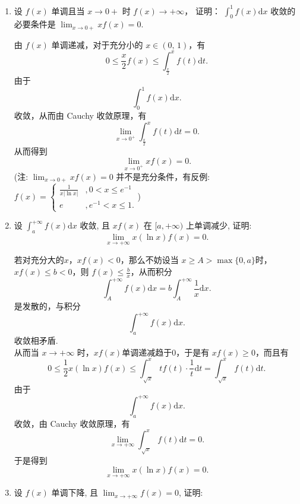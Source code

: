 \begin{enumerate}
    \item[4.]设 \(f(x)\) 单调且当 \(\displaystyle x\rightarrow 0+\) 时 \(\displaystyle f(x)\rightarrow +\infty\)，
    证明： \(\displaystyle\int_{0}^{1}f(x)\mathrm{d}x\) 收敛的必要条件是 $\displaystyle \lim_{x\to 0+} xf(x)=0$.
    \begin{solution}
        由 $f(x)$ 单调递减，对于充分小的 $x\in(0,\,1)$，有
        \[
        0\leq \frac{x}{2}f(x)\leq \int_{\frac{x}{2}}^{x}f(t)\mathrm{d}t.
        \]
        由于
        \[
        \int_{0}^{1}f(x)\mathrm{d}x.
        \]
        收敛，从而由 Cauchy 收敛原理，有
        \[
        \lim_{x \to 0^+}\int_{\frac{x}{2}}^{x}f(t)\mathrm{d}t=0.
        \]
        从而得到
        \[
        \lim_{x \to 0^+}xf(x)=0. 
        \]
        (注: $\displaystyle \lim_{x\to 0+} xf(x)=0$ 并不是充分条件，有反例: $f(x)=
        \begin{cases}
            \displaystyle \frac{1}{x\left| \ln{x} \right|} &, 0< x\leq e^{-1}\\
            \displaystyle e &, e^{-1}<x\leq 1.
        \end{cases}$)
    \end{solution}
    \item[5.]设 \(\displaystyle\int_{a}^{+\infty} f(x) \mathrm{d}x\) 收敛, 且 \(\displaystyle x f(x)\) 在 \([a, +\infty)\) 上单调减少, 证明:
    \[\displaystyle\lim_{x\to +\infty}x(\ln x)f(x) = 0.\]
    \begin{solution}
        若对充分大的$x$，$xf(x)<0$，那么不妨设当 $\displaystyle x\geq A > \max\{0,a\}$时，$xf(x)\leq b<0$，则 $\displaystyle f(x)\leq \frac{b}{x}$，从而积分
        \[
        \int_{A}^{+\infty}f(x)\mathrm{d}x=b\int_{A}^{+\infty}\frac{1}{x}\mathrm{d}x.
        \]是发散的，与积分
        \[
        \int_{a}^{+\infty}f(x)\mathrm{d}x.
        \]收敛相矛盾.\\
        从而当 $x\to+\infty$ 时，$xf(x)$单调递减趋于0，于是有 $xf(x)\geq0$，而且有
        \[
        0\leq \frac{1}{2}x(\ln{x})f(x)\leq \int_{\sqrt{x}}^{x}tf(t)\cdot\frac{1}{t}\mathrm{d}t=\int_{\sqrt{x}}^{x}f(t)\mathrm{d}t.
        \]
        由于
        \[
        \int_{a}^{+\infty}f(x)\mathrm{d}x.
        \]
        收敛，由 Cauchy 收敛原理，有
        \[
        \lim_{x \to +\infty}\int_{\sqrt{x}}^{x}f(t)\mathrm{d}t=0.
        \]
        于是得到
        \[
        \lim_{x \to +\infty}x(\ln{x})f(x)=0.
        \]
    \end{solution}
    \item[6.]设 \(f(x)\) 单调下降, 且 \(\displaystyle\lim_{x\to +\infty}f(x) = 0\), 证明: 

\end{enumerate}
